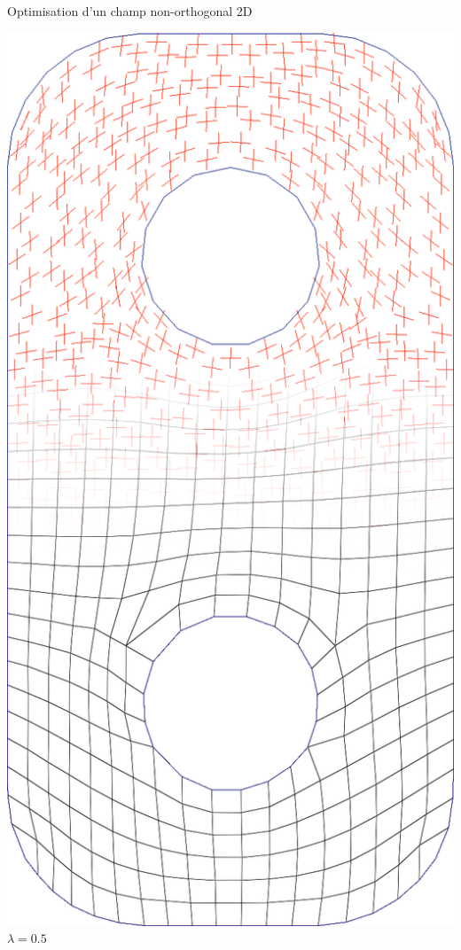 \begin{frame}{Optimisation d'un champ non-orthogonal 2D}
\begin{minipage}[b]{0.15\textwidth}
        \centering
        \includegraphics[width=\textwidth]{img_spm_ff/perced_9}
        $\lambda = 0.5$
    \end{minipage}
    \ \ \ 
    \begin{minipage}[b]{0.15\textwidth}

\end{minipage}
\end{frame}
